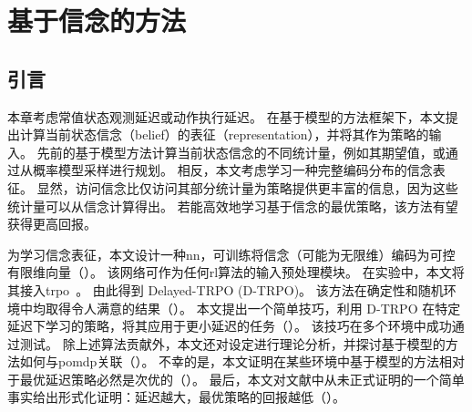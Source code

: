 \chapter{基于信念的方法}
\label{chap:belief_based}

\section{引言}
本章考虑常值状态观测延迟或动作执行延迟。
在基于模型的方法框架下，本文提出计算当前状态信念（belief）的表征（representation），并将其作为策略的输入。
先前的基于模型方法计算当前状态信念的不同统计量，例如其期望值\cite{walsh2009learning,firoiu2018human,derman2021acting}，或通过从概率模型采样进行规划\cite{chen2021delay}。
相反，本文考虑学习一种完整编码分布的信念表征。
显然，访问信念比仅访问其部分统计量为策略提供更丰富的信息，因为这些统计量可以从信念计算得出。
若能高效地学习基于信念的最优策略，该方法有望获得更高回报。

为学习信念表征，本文设计一种\gls{nn}，可训练将信念（可能为无限维）编码为可控有限维向量（）。
该网络可作为任何\gls{rl}算法的输入预处理模块。
在实验中，本文将其接入\gls{trpo}~\cite{schulman2015trust}。
由此得到 Delayed-TRPO (D-TRPO)。
该方法在确定性和随机环境中均取得令人满意的结果（）。
本文提出一个简单技巧，利用 D-TRPO 在特定延迟下学习的策略，将其应用于更小延迟的任务（）。
该技巧在多个环境中成功通过测试。
除上述算法贡献外，本文还对设定进行理论分析，并探讨基于模型的方法如何与\gls{pomdp}关联（）。
不幸的是，本文证明在某些环境中基于模型的方法相对于最优延迟策略必然是次优的（）。
最后，本文对文献中从未正式证明的一个简单事实给出形式化证明：延迟越大，最优策略的回报越低（）。






